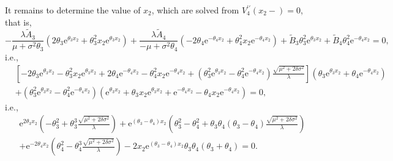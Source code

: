 \documentclass[11pt,reqno]{article}%
\numberwithin{equation}{section}
\begin{document}
It remains to determine the value of $x_2$, which are solved from $V^{\prime\prime}_4(x_2-) = 0$, that is,
\begin{equation}\label{eq2:x1x22}
 -\frac{\lambda \tilde{A}_3}{\mu+\sigma^2\theta_3}\left(2\theta_{3}\mathrm{e}^{\theta_{3}x_2}+\theta_{3}^2x_2\mathrm{e}^{\theta_{3}x_2}\right)+\frac{\lambda \tilde{A}_4}{-\mu+\sigma^2\theta_4}\left(-2\theta_{4}\mathrm{e}^{-\theta_{4}x_2}+\theta_{4}^2x_2\mathrm{e}^{-\theta_{4}x_2}\right)+\tilde{B}_{3} \theta_{3}^2\mathrm{e}^{\theta_{3} x_2}+\tilde{B}_{4} \theta_{4}^2\mathrm{e}^{-\theta_{4}x_2} = 0,
\end{equation}
i.e.,
\begin{equation}\nonumber\begin{aligned}
&\left[-2\theta_{3}\mathrm{e}^{\theta_{3}x_2}-\theta_{3}^2x_2\mathrm{e}^{\theta_{3}x_2}+2\theta_{4}\mathrm{e}^{-\theta_{4}x_2}-\theta_{4}^2x_2\mathrm{e}^{-\theta_{4}x_2}+\left(\theta_{3}^2\mathrm{e}^{\theta_{3} x_2}- \theta_{4}^2\mathrm{e}^{-\theta_{4}x_2}\right)\frac{\sqrt{\mu^2 + 2 \delta \sigma^2}}{\lambda}\right]\left(\theta_{3} \mathrm{e}^{\theta_{3}x_2}+\theta_{4}\mathrm{e}^{-\theta_{4}x_2}\right)\\&+\left(\theta_{3}^2\mathrm{e}^{\theta_{3} x_2}- \theta_{4}^2\mathrm{e}^{-\theta_{4}x_2}\right)\left(\mathrm{e}^{\theta_{3}x_2}+\theta_{3}x_2\mathrm{e}^{\theta_{3}x_2}+\mathrm{e}^{-\theta_{4}x_2}-\theta_{4}x_2\mathrm{e}^{-\theta_{4}x_2}\right)=0,
\end{aligned}
\end{equation}
i.e.,
\begin{equation}\label{eq2:x1x23}\begin{aligned}
&\mathrm{e}^{2\theta_{3}x_2}\left(-\theta_{3}^2+\theta_{3}^3\frac{\sqrt{\mu^2 + 2 \delta \sigma^2}}{\lambda}\right)+\mathrm{e}^{(\theta_{3}-\theta_{4})x_2}\left(\theta_{3}^2-\theta_{4}^2+\theta_{3}\theta_{4}(\theta_{3}-\theta_{4})\frac{\sqrt{\mu^2 + 2 \delta \sigma^2}}{\lambda}\right)\\&+\mathrm{e}^{-2\theta_{4}x_2}\left(\theta_{4}^2-\theta_{4}^3\frac{\sqrt{\mu^2 + 2 \delta \sigma^2}}{\lambda}\right)-2x_2\mathrm{e}^{(\theta_{3}-\theta_{4})x_2}\theta_{3}\theta_{4}(\theta_{3}+\theta_{4})=0.
\end{aligned}
\end{equation}
\end{document}
